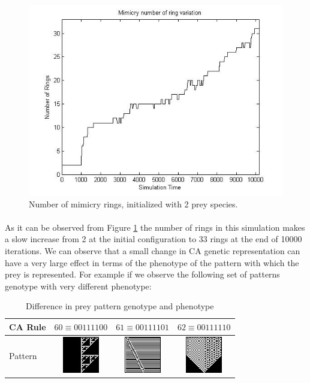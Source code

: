 \begin{figure}
	\centering
	\includegraphics[scale=0.40]{images/ringSize10k-2Prey}
	\caption{Number of mimicry rings, initialized with 2 prey species.}
	\label{fig:ringSize10k-2Prey}
\end{figure}

\paragraph{}
As it can be observed from Figure \ref{fig:ringSize10k-2Prey} the number of rings in this simulation makes a slow increase from 2 at the initial configuration to 33 rings at the end of 10000 iterations. We can observe that a small change in CA genetic representation can have a very large effect in terms of the phenotype of the pattern with which the prey is represented. For example if we observe the following set of patterns genotype with very different phenotype:

\begin{table}
\centering
\caption{Difference in prey pattern genotype and phenotype}
\label{tab:diff-in-pattern}
\begin{tabular}{|l|c|c|c|}
  \hline
  CA Rule & \(60 \equiv 00111100\) & \(61 \equiv 00111101\) & \(62 \equiv 00111110 \) \\ \hline
  Pattern & \includegraphics[scale=0.50]{images/CARule60} & \includegraphics[scale=0.50]{images/CARule61} & \includegraphics[scale=0.50]{images/CARule62}\\
  \hline
\end{tabular}
\end{table}

